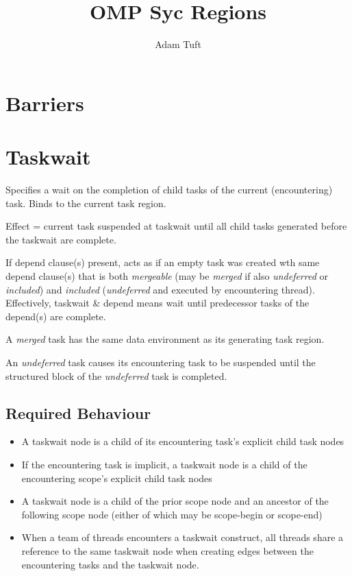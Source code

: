 \documentclass[11pt,a4paper]{article}
\title{OMP Syc Regions}
\begin{document}
\author{Adam Tuft}
\maketitle

\section{Barriers}

\section{Taskwait}

Specifies a wait on the completion of child tasks of the current (encountering) task. Binds to the current task region.

Effect = current task suspended at taskwait until all child tasks generated before the taskwait are complete.

If depend clause(s) present, acts as if an empty task was created wth same depend clause(s) that is both \emph{mergeable} (may be \emph{merged} if also \emph{undeferred} or \emph{included}) and \emph{included} (\emph{undeferred} and executed by encountering thread). Effectively, taskwait \& depend means wait until predecessor tasks of the depend(s) are complete.

A \emph{merged} task has the same data environment as its generating task region.

An \emph{undeferred} task causes its encountering task to be suspended until the structured block of the \emph{undeferred} task is completed.

\subsection{Required Behaviour}

\begin{itemize}
\item A taskwait node is a child of its encountering task's explicit child task nodes
\item If the encountering task is implicit, a taskwait node is a child of the encountering scope's explicit child task nodes
\item A taskwait node is a child of the prior scope node and an ancestor of the following scope node (either of which may be scope-begin or scope-end)
\item When a team of threads encounters a taskwait construct, all threads share a reference to the same taskwait node when creating edges between the encountering tasks and the taskwait node.
\end{itemize}
\end{document}

